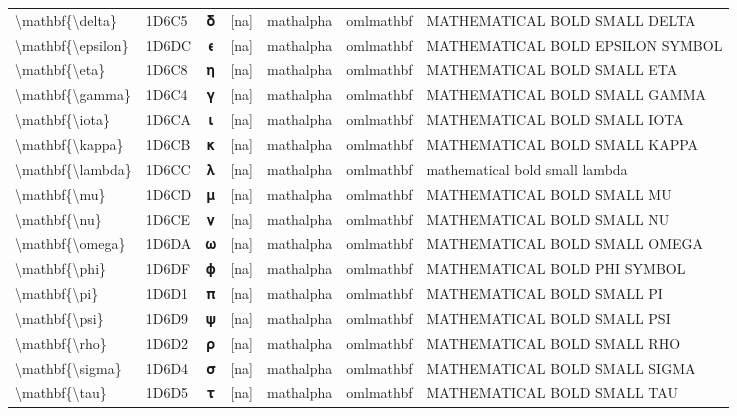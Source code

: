 \documentclass[a4paper,landscape]{article}
\begin{document}
\begin{longtable}{llcclll}
\textbackslash{}mathbf\{\textbackslash{}delta\} & 1D6C5 & 𝛅 & [na] & mathalpha & omlmathbf & MATHEMATICAL BOLD SMALL DELTA \\
\textbackslash{}mathbf\{\textbackslash{}epsilon\} & 1D6DC & 𝛜 & [na] & mathalpha & omlmathbf & MATHEMATICAL BOLD EPSILON SYMBOL \\
\textbackslash{}mathbf\{\textbackslash{}eta\} & 1D6C8 & 𝛈 & [na] & mathalpha & omlmathbf & MATHEMATICAL BOLD SMALL ETA \\
\textbackslash{}mathbf\{\textbackslash{}gamma\} & 1D6C4 & 𝛄 & [na] & mathalpha & omlmathbf & MATHEMATICAL BOLD SMALL GAMMA \\
\textbackslash{}mathbf\{\textbackslash{}iota\} & 1D6CA & 𝛊 & [na] & mathalpha & omlmathbf & MATHEMATICAL BOLD SMALL IOTA \\
\textbackslash{}mathbf\{\textbackslash{}kappa\} & 1D6CB & 𝛋 & [na] & mathalpha & omlmathbf & MATHEMATICAL BOLD SMALL KAPPA \\
\textbackslash{}mathbf\{\textbackslash{}lambda\} & 1D6CC & 𝛌 & [na] & mathalpha & omlmathbf & mathematical bold small lambda \\
\textbackslash{}mathbf\{\textbackslash{}mu\} & 1D6CD & 𝛍 & [na] & mathalpha & omlmathbf & MATHEMATICAL BOLD SMALL MU \\
\textbackslash{}mathbf\{\textbackslash{}nu\} & 1D6CE & 𝛎 & [na] & mathalpha & omlmathbf & MATHEMATICAL BOLD SMALL NU \\
\textbackslash{}mathbf\{\textbackslash{}omega\} & 1D6DA & 𝛚 & [na] & mathalpha & omlmathbf & MATHEMATICAL BOLD SMALL OMEGA \\
\textbackslash{}mathbf\{\textbackslash{}phi\} & 1D6DF & 𝛟 & [na] & mathalpha & omlmathbf & MATHEMATICAL BOLD PHI SYMBOL \\
\textbackslash{}mathbf\{\textbackslash{}pi\} & 1D6D1 & 𝛑 & [na] & mathalpha & omlmathbf & MATHEMATICAL BOLD SMALL PI \\
\textbackslash{}mathbf\{\textbackslash{}psi\} & 1D6D9 & 𝛙 & [na] & mathalpha & omlmathbf & MATHEMATICAL BOLD SMALL PSI \\
\textbackslash{}mathbf\{\textbackslash{}rho\} & 1D6D2 & 𝛒 & [na] & mathalpha & omlmathbf & MATHEMATICAL BOLD SMALL RHO \\
\textbackslash{}mathbf\{\textbackslash{}sigma\} & 1D6D4 & 𝛔 & [na] & mathalpha & omlmathbf & MATHEMATICAL BOLD SMALL SIGMA \\
\textbackslash{}mathbf\{\textbackslash{}tau\} & 1D6D5 & 𝛕 & [na] & mathalpha & omlmathbf & MATHEMATICAL BOLD SMALL TAU \\

\end{longtable}
\end{document}
